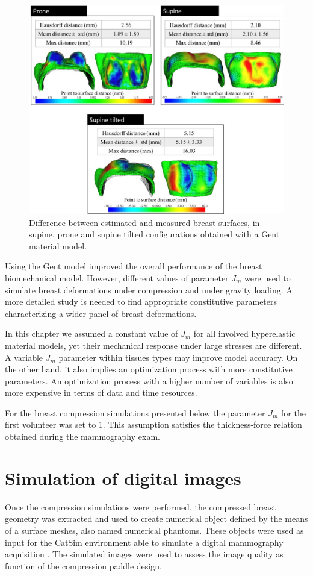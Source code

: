 \begin{figure}[!h]
\centering
\includegraphics[width=\textwidth,keepaspectratio]{figures/modelevaluation_gent.jpg} 
\caption{Difference between estimated and measured breast surfaces, in supine, prone and supine tilted configurations obtained with a Gent material model. }\label{fig:modelevaluation_gent}
\end{figure}

Using the Gent model improved the overall performance of the breast biomechanical model. However, different values of  parameter $J_m$ were used to simulate breast deformations under compression and under gravity loading. A more detailed study is needed to find appropriate constitutive parameters characterizing a wider panel of breast deformations.  

 In this chapter we assumed a constant value of $J_m$ for all involved hyperelastic material models, yet their mechanical response under large stresses are different. A variable $J_m$ parameter within tissues types may improve model accuracy.  On the other hand, it also implies an optimization process with more constitutive parameters. An optimization process with a higher number of variables is also more expensive in terms of data and time resources. 
 
 For the breast compression simulations presented below the parameter $J_m$ for the first volunteer was set to 1. This assumption satisfies the thickness-force  relation obtained during the mammography exam.

\section{Simulation of digital images }
Once the compression simulations were performed, the compressed breast geometry was extracted and used to create numerical object defined by the means of a surface meshes, also named numerical phantoms. These objects were used as input for the CatSim environment able to simulate a digital mammography  acquisition \citep{de_low_2014,de_catsim_2007}. The simulated images were used to assess the image quality as function of the compression paddle design.

